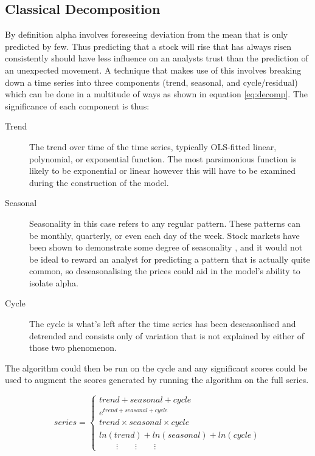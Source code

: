\subsection{Classical Decomposition}
By definition alpha involves foreseeing deviation from the mean that is only predicted by few. Thus predicting that a stock will rise that has always risen consistently should have less influence on an analysts trust than the prediction of an unexpected movement. A technique that makes use of this involves breaking down a time series into three components (trend, seasonal, and cycle/residual) which can be done in a multitude of ways as shown in equation \ref{eq:decomp}. The significance of each component is thus:
\begin{description}
    \item[Trend] The trend over time of the time series, typically OLS-fitted linear, polynomial, or exponential function. The most parsimonious function is likely to be exponential or linear however this will have to be examined during the construction of the model.
    \item[Seasonal] Seasonality in this case refers to any regular pattern. These patterns can be monthly, quarterly, or even each day of the week. Stock markets have been shown to demonstrate some degree of seasonality \cite{bogousslavsky2016infrequent}, and it would not be ideal to reward an analyst for predicting a pattern that is actually quite common, so deseasonalising the prices could aid in the model's ability to isolate alpha.
    \item[Cycle] The cycle is what's left after the time series has been deseasonlised and detrended and consists only of variation that is not explained by either of those two phenomenon.
\end{description}
The algorithm could then be run on the cycle and any significant scores could be used to augment the scores generated by running the algorithm on the full series.



\begin{equation}
    \textit{series} = \begin{cases}
    \textit{trend} + \textit{seasonal} + \textit{cycle} \\
    e^{\textit{trend} + \textit{seasonal} + \textit{cycle}} \\
    \textit{trend}\times \textit{seasonal}\times \textit{cycle} \\
    ln(\textit{trend}) + ln(\textit{seasonal}) + ln(\textit{cycle})\\
    \qquad\vdots\qquad\vdots\qquad\vdots
    \end{cases} \label{eq:decomp}
\end{equation}

